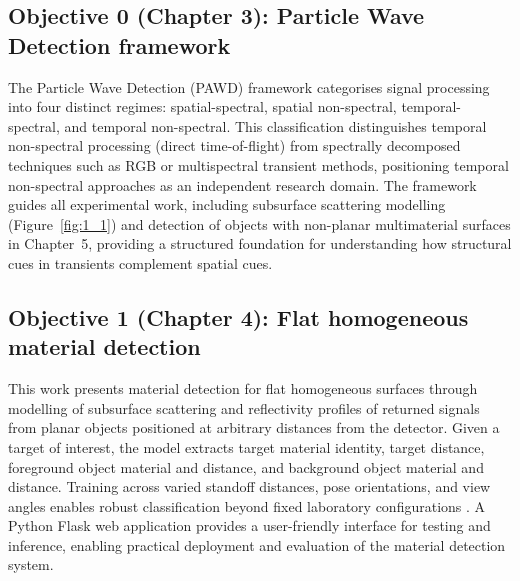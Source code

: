 \documentclass[12pt,a4paper,oneside]{report}
\begin{document}
\subsection{Objective 0 (Chapter 3): Particle Wave Detection framework}
The Particle Wave Detection (PAWD) framework categorises signal processing into four distinct regimes: spatial-spectral, spatial non-spectral, temporal-spectral, and temporal non-spectral. This classification distinguishes temporal non-spectral processing (direct time-of-flight) from spectrally decomposed techniques such as RGB or multispectral transient methods, positioning temporal non-spectral approaches as an independent research domain. The framework guides all experimental work, including subsurface scattering modelling (Figure~\ref{fig:1_1}) and detection of objects with non-planar multimaterial surfaces in Chapter~5, providing a structured foundation for understanding how structural cues in transients complement spatial cues.

\subsection{Objective 1 (Chapter 4): Flat homogeneous material detection}
This work presents material detection for flat homogeneous surfaces through modelling of subsurface scattering and reflectivity profiles of returned signals from planar objects positioned at arbitrary distances from the detector. Given a target of interest, the model extracts target material identity, target distance, foreground object material and distance, and background object material and distance. Training across varied standoff distances, pose orientations, and view angles enables robust classification beyond fixed laboratory configurations \cite{becker2023}. A Python Flask web application provides a user-friendly interface for testing and inference, enabling practical deployment and evaluation of the material detection system.
\end{document}
